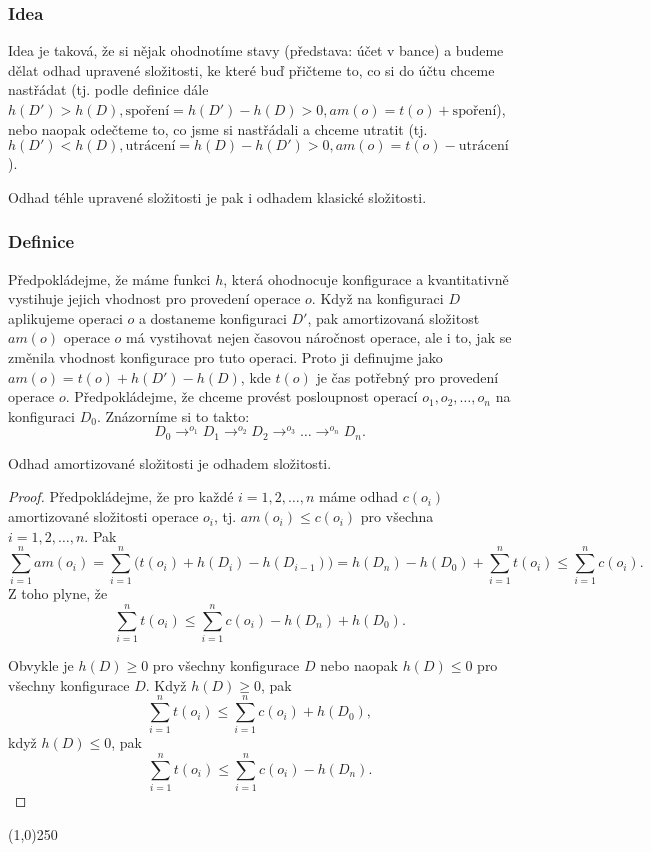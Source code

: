\documentclass[a4paper,12pt]{article}
\newenvironment{myproof}{
  \begin{proof}
    
  }{
  \end{proof}
  \begin{center}
   \line(1,0){250}
   \end{center}
  }
\begin{document}
\subsubsection{Idea}


Idea je taková, že si nějak ohodnotíme stavy (představa: účet v bance) a budeme dělat odhad upravené složitosti, ke které buď přičteme to, co si do účtu chceme nastřádat (tj. podle definice dále $h(D') > h(D), \mbox{spoření}=h(D')-h(D)>0,am(o)=t(o)+\mbox{spoření}$), nebo naopak odečteme to, co jsme si nastřádali a chceme utratit (tj. $h(D') < h(D), \mbox{utrácení}=h(D)-h(D')>0,am(o)=t(o)-\mbox{utrácení}$).

Odhad téhle upravené složitosti je pak i odhadem klasické složitosti.

\subsubsection{Definice}

Předpokládejme, že máme funkci $
h$, 
která ohodnocuje konfigurace a kvantitativně vystihuje 
jejich vhodnost pro provedení operace $o$. 
Když na konfiguraci $D$ aplikujeme operaci $o$ 
a dostaneme konfiguraci $D'$, pak amortizovaná složitost 
$am(o)$ ope\-race $o$ má vystihovat nejen časovou náročnost 
operace, ale i to, jak se změnila vhodnost konfigurace pro 
tuto operaci. Proto ji defi\-nujme jako $am(o)=t(o)+h(D')-h(D)$, kde $
t(o)$ je 
čas potřebný pro provedení operace $o$. Předpokládejme, 
že chceme provést posloupnost operací $o_1,o_2,\dots,o_n$ na 
konfiguraci $D_0$. Znázorníme si to takto:
$$D_0\to^{o_1}D_1\to^{o_2}D_2\to^{o_3}\dots\to^{o_n}D_n.$$

\begin{veta}
    Odhad amortizované složitosti je odhadem složitosti.
\end{veta}

\begin{myproof}

Předpokládejme, že pro každé $i=1,2,\dots,n$ máme odhad 
$c(o_i)$ amortizované složitos\-ti operace $o_i$, tj. $am(o_
i)\le c(o_i)$ 
pro všechna $i=1,2,\dots,n$. Pak
$$\sum_{i=1}^nam(o_i)=\sum_{i=1}^n\big(t(o_i)+h(D_i)-h(D_{i-1})\big
)=h(D_n)-h(D_0)+\sum_{i=1}^nt(o_i)\le\sum_{i=1}^nc(o_i).$$
Z toho plyne, že 
$$\sum_{i=1}^nt(o_i)\le\sum_{i=1}^nc(o_i)-h(D_n)+h(D_0).$$

Obvykle je $h(D)\ge 0$ pro všechny konfigurace $D$ 
nebo naopak $h(D)\le 0$ 
pro všechny konfigurace $D$. Když $h(D)\ge 0$, pak 
$$\sum_{i=1}^nt(o_i)\le\sum_{i=1}^nc(o_i)+h(D_0),$$
když $h(D)\le 0$, pak 
$$\sum_{i=1}^nt(o_i)\le\sum_{i=1}^nc(o_i)-h(D_n).$$

\end{myproof}
\end{document}
